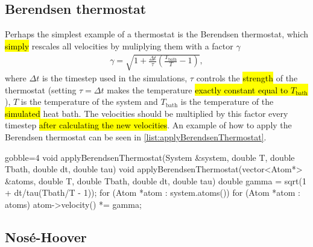 \subsection{Berendsen thermostat}
Perhaps the simplest example of a thermostat is the Berendsen thermostat\cite{berendsen1984molecular}, which \hl{simply} rescales all velocities by muliplying them with a factor $\gamma$
\begin{align*}
    \gamma = \sqrt{1 + \frac{\Delta t}{\tau}\left(\frac{T_\text{bath}}{T} - 1\right)},
\end{align*}
where $\Delta t$ is the timestep used in the simulations, $\tau$ controls the \hl{strength} of the thermostat (setting $\tau = \Delta t$ makes the temperature \hl{exactly constant equal to $T_\text{bath}$}), $T$ is the temperature of the system and $T_\text{bath}$ is the temperature of the \hl{simulated} heat bath. The velocities should be multiplied by this factor every timestep \hl{after calculating the new velocities}. An example of how to apply the Berendsen thermostat can be seen in \cref{list:applyBerendsenThermostat}.
%
\begin{listing}[!htb]%
\begin{cppcode*}{gobble=4}
    void applyBerendsenThermostat(System &system, double T, double Tbath, 
        double dt, double tau)
    void applyBerendsenThermostat(vector<Atom*> &atoms, double T, double Tbath, 
        double dt, double tau)
    {
        double gamma = sqrt(1 + dt/tau(Tbath/T - 1));
        for (Atom *atom : system.atoms())
        for (Atom *atom : atoms)
        {
            atom->velocity() *= gamma;
        }
    }
\end{cppcode*}
\caption{%
    \texttt{applyBerendsenThermostat}. \hl{decide on System or vector<Atom*> as input}%
    \label{list:applyBerendsenThermostat}%
}%
\end{listing}%

\subsection{Nos\'e-Hoover}



